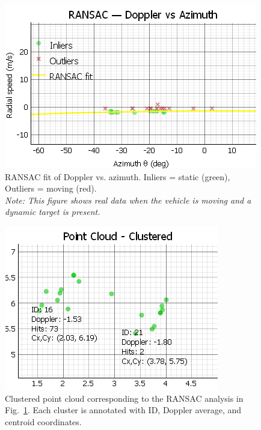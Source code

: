 \begin{figure}[!htbp]
    \centering
    \includegraphics[width=1.0\linewidth]{images/RANSAC_movingTarget_wPtCloud.png}
    \caption{RANSAC fit of Doppler vs. azimuth. Inliers = static (green), Outliers = moving (red).\\
    \textit{Note: This figure shows real data when the vehicle is moving and a dynamic target is present.}}
    \label{fig:ransac_real_static_dynamic}
\end{figure}

\begin{figure}[!htbp]
    \centering
    \includegraphics[width=1.0\linewidth]{images/RANSAC_movingTarget_ptCloud.png}
    \caption{Clustered point cloud corresponding to the RANSAC analysis in Fig.~\ref{fig:ransac_real_static_dynamic}. 
    Each cluster is annotated with ID, Doppler average, and centroid coordinates.}
    \label{fig:ransac_clustered_ptcloud}
\end{figure}

